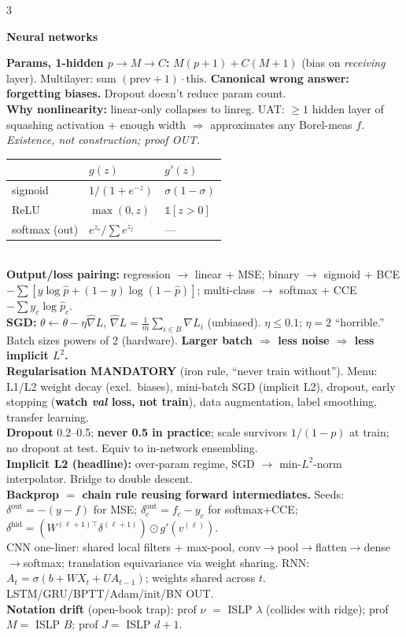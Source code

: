 \documentclass[a4paper,9pt]{extarticle}
\newcommand{\hd}[1]{\textbf{#1}}
\newcommand{\sect}[1]{\par\vspace{1pt}\noindent\colorbox{black!10}{\parbox{\dimexpr\linewidth-2\fboxsep\relax}{\strut\textbf{#1}\strut}}\par\vspace{1pt}}
\begin{document}
\begin{multicols*}{3}
\sect{Neural networks}
\hd{Params, 1-hidden $p\to M\to C$:} $M(p{+}1)+C(M{+}1)$ (bias on \emph{receiving} layer). Multilayer: sum $(\text{prev}{+}1)\cdot\text{this}$. \hd{Canonical wrong answer: forgetting biases.} Dropout doesn't reduce param count.\\
\hd{Why nonlinearity:} linear-only collapses to linreg. UAT: $\ge 1$ hidden layer of squashing activation + enough width $\Rightarrow$ approximates any Borel-meas $f$. \emph{Existence, not construction; proof OUT.}\\
\begin{tabular}{l|ll}
& $g(z)$ & $g'(z)$\\\hline
sigmoid & $1/(1{+}e^{-z})$ & $\sigma(1{-}\sigma)$\\
ReLU & $\max(0,z)$ & $\mathbb 1[z>0]$\\
softmax (out) & $e^{z_c}/\sum e^{z_j}$ & ---
\end{tabular}\\
\hd{Output/loss pairing:} regression $\to$ linear $+$ MSE; binary $\to$ sigmoid $+$ BCE $-\!\sum[y\log\hat p+(1{-}y)\log(1{-}\hat p)]$; multi-class $\to$ softmax $+$ CCE $-\!\sum y_c\log\hat p_c$.\\
\hd{SGD:} $\theta\!\leftarrow\!\theta-\eta\hat\nabla L$, $\hat\nabla L=\tfrac1m\sum_{i\in B}\nabla L_i$ (unbiased). $\eta\!\le\!0.1$; $\eta\!=\!2$ ``horrible.'' Batch sizes powers of 2 (hardware). \hd{Larger batch $\Rightarrow$ less noise $\Rightarrow$ less implicit $L^2$.}\\
\hd{Regularisation MANDATORY} (iron rule, ``never train without''). Menu: L1/L2 weight decay (excl.\ biases), mini-batch SGD (implicit L2), dropout, early stopping (\hd{watch \emph{val} loss, not train}), data augmentation, label smoothing, transfer learning.\\
\hd{Dropout} 0.2--0.5; \hd{never 0.5 in practice}; scale survivors $1/(1{-}p)$ at train; no dropout at test. Equiv to in-network ensembling.\\
\hd{Implicit L2 (headline):} over-param regime, SGD $\to$ min-$L^2$-norm interpolator. Bridge to double descent.\\
\hd{Backprop $=$ chain rule reusing forward intermediates.} Seeds: $\delta^{\text{out}}=-(y-f)$ for MSE; $\delta^{\text{out}}_c=f_c-y_c$ for softmax$+$CCE; $\delta^{\text{hid}}=(W^{(\ell+1)\top}\delta^{(\ell+1)})\odot g'(v^{(\ell)})$.\\
CNN one-liner: shared local filters + max-pool, conv$\to$pool$\to$flatten$\to$dense$\to$softmax; translation equivariance via weight sharing. RNN: $A_t=\sigma(b+WX_t+UA_{t-1})$; weights shared across $t$. LSTM/GRU/BPTT/Adam/init/BN OUT.\\
\hd{Notation drift} (open-book trap): prof $\nu$ $=$ ISLP $\lambda$ (collides with ridge); prof $M=$ ISLP $B$; prof $J=$ ISLP $d{+}1$.


\end{multicols*}
\end{document}
